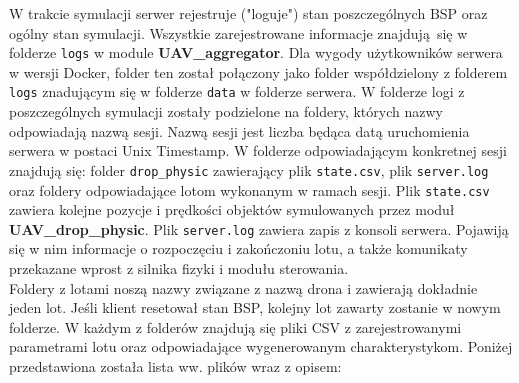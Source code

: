 \documentclass[15pt]{sprawozdanie}
\begin{document}
W trakcie symulacji serwer rejestruje ("loguje") stan poszczególnych BSP oraz ogólny stan symulacji. Wszystkie zarejestrowane informacje znajdują się w folderze \texttt{logs} w module \textbf{UAV\_aggregator}. Dla wygody użytkowników serwera w wersji Docker, folder ten został połączony jako folder współdzielony z folderem \texttt{logs} znadującym się w folderze \texttt{data} w folderze serwera. W folderze logi z poszczególnych symulacji zostały podzielone na foldery, których nazwy odpowiadają nazwą sesji. Nazwą sesji jest liczba będąca datą uruchomienia serwera w postaci Unix Timestamp. W folderze odpowiadającym konkretnej sesji znajdują się: folder \texttt{drop\_physic} zawierający plik \texttt{state.csv}, plik \texttt{server.log} oraz foldery odpowiadające lotom wykonanym w ramach sesji. Plik \texttt{state.csv} zawiera kolejne pozycje i prędkości objektów symulowanych przez moduł \textbf{UAV\_drop\_physic}. Plik \texttt{server.log} zawiera zapis z konsoli serwera. Pojawiją się w nim informacje o rozpoczęciu i zakończoniu lotu, a także komunikaty przekazane wprost z silnika fizyki i modułu sterowania.\\

Foldery z lotami noszą nazwy związane z nazwą drona i zawierają dokładnie jeden lot. Jeśli klient resetował stan BSP, kolejny lot zawarty zostanie w nowym folderze. W każdym z folderów znajdują się pliki CSV z zarejestrowanymi parametrami lotu oraz odpowiadające wygenerowanym charakterystykom. Poniżej przedstawiona została lista ww. plików wraz z opisem:
\end{document}
